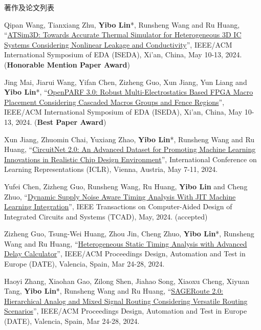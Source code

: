 \begin{rSection}{著作及论文列表}
\begin{description}[font=\normalfont, rightmargin=2em]
\item[{[C146]}]{
        Qipan Wang, Tianxiang Zhu, \textbf{Yibo Lin}*, Runsheng Wang and Ru Huang, 
    ``\href{https://doi.org/10.1109/ISEDA62518.2024.10617604}{ATSim3D: Towards Accurate Thermal Simulator for Heterogeneous 3D IC Systems Considering Nonlinear Leakage and Conductivity}'', 
    IEEE/ACM International Symposium of EDA (ISEDA), Xi'an, China, May 10-13, 2024.
    (\textbf{Honorable Mention Paper Award})
}
            

\item[{[C145]}]{
        Jing Mai, Jiarui Wang, Yifan Chen, Zizheng Guo, Xun Jiang, Yun Liang and \textbf{Yibo Lin}*, 
    ``\href{https://doi.org/10.1109/ISEDA62518.2024.10617535}{OpenPARF 3.0: Robust Multi-Electrostatics Based FPGA Macro Placement Considering Cascaded Macros Groups and Fence Regions}'', 
    IEEE/ACM International Symposium of EDA (ISEDA), Xi'an, China, May 10-13, 2024.
    (\textbf{Best Paper Award})
}
            

\item[{[C144]}]{
        Xun Jiang, Zhuomin Chai, Yuxiang Zhao, \textbf{Yibo Lin}*, Runsheng Wang and Ru Huang, 
    ``\href{https://openreview.net/pdf?id=nMFSUjxMIl}{CircuitNet 2.0: An Advanced Dataset for Promoting Machine Learning Innovations in Realistic Chip Design Environment}'', 
    International Conference on Learning Representations (ICLR), Vienna, Austria, May 7-11, 2024.
    
}
            

\item[{[J143]}]{
        Yufei Chen, Zizheng Guo, Runsheng Wang, Ru Huang, \textbf{Yibo Lin} and Cheng Zhuo, 
    ``\href{https://doi.org/10.1109/TCAD.2023.3342603}{Dynamic Supply Noise Aware Timing Analysis With JIT Machine Learning Integration}'', 
    IEEE Transactions on Computer-Aided Design of Integrated Circuits and Systems (TCAD), May, 2024.
    (accepted)
}
            

\item[{[C142]}]{
        Zizheng Guo, Tsung-Wei Huang, Zhou Jin, Cheng Zhuo, \textbf{Yibo Lin}*, Runsheng Wang and Ru Huang, 
    ``\href{https://ieeexplore.ieee.org/document/10546507}{Heterogeneous Static Timing Analysis with Advanced Delay Calculator}'', 
    IEEE/ACM Proceedings Design, Automation and Test in Europe (DATE), Valencia, Spain, Mar 24-28, 2024.
    
}
            

\item[{[C141]}]{
        Haoyi Zhang, Xiaohan Gao, Zilong Shen, Jiahao Song, Xiaoxu Cheng, Xiyuan Tang, \textbf{Yibo Lin}*, Runsheng Wang and Ru Huang, 
    ``\href{https://ieeexplore.ieee.org/document/10546542}{SAGERoute 2.0: Hierarchical Analog and Mixed Signal Routing Considering Versatile Routing Scenarios}'', 
    IEEE/ACM Proceedings Design, Automation and Test in Europe (DATE), Valencia, Spain, Mar 24-28, 2024.
    
}
\end{description}
\end{rSection}
